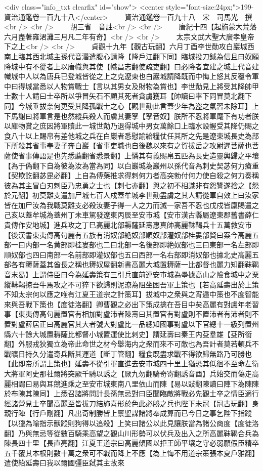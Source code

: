 <div class="info_txt clearfix" id="show">
<center style="font-size:24px;">199-資治通鑑卷一百九十八</center>
  　　資治通鑑卷一百九十八　宋　司馬光　撰<br />
<br />
　　胡三省　音註<br />
<br />
　　唐紀十四【起旃蒙大荒落六月盡著雍涒灘三月凡二年有奇】<br />
<br />
　　太宗文武大聖大廣孝皇帝下之上<br />
<br />
　　貞觀十九年【觀古玩翻】六月丁酉李世勣攻白巖城西南上臨其西北城主孫代音濳遣腹心請降【降戶江翻下同】臨城投刀鉞為信且曰奴願降城中有不從者上以唐幟與其使【幟昌志翻使疏吏翻】曰必降者宜建之城上代音建幟城中人以為唐兵已登城皆從之上之克遼東也白巖城請降既而中悔上怒其反覆令軍中曰得城當悉以人物賞戰士【言以其男女及財物為賞也】李世勣見上將受其降帥甲士數十人請曰士卒所以爭冒矢石不顧其死者貪虜獲耳【帥讀曰率下同冒莫北翻下同】今城垂拔奈何更受其降孤戰士之心【觀世勣此言蓋少年為盗之氣習未除耳】上下馬謝曰將軍言是也然縱兵殺人而虜其妻孥【孥音奴】朕所不忍將軍麾下有功者朕以庫物賞之庶因將軍贖此一城世勣乃退得城中男女萬餘口上臨水設幄受其降仍賜之食八十以上賜帛有差他城之兵在白巖者悉慰諭給糧仗任其所之先是遼東城長史為部下所殺其省事奉妻子奔白巖【省事吏職也自後魏以來有之賀拔岳之攻尉遲菩薩也菩薩使省事傳語是也先悉薦翻省悉景翻】上憐其有義賜帛五匹為長史造靈輿歸之平壤【為于偽翻下自為彼為汝為當為同】以白巖城為巖州以孫代音為刺史契苾何力瘡重【契欺訖翻苾毘必翻】上自為傅藥推求得刺何力者高突勃付何力使自殺之何力奏稱彼為其主冒白刃刺臣乃忠勇之士也【刺七亦翻】與之初不相識非有怨讐遂捨之【怨於元翻】初莫離支遣加尸城七百人戍蓋牟城李世勣盡虜之其人請從軍自效上曰汝家皆在加尸汝為我戰莫離支必殺汝妻子得一人之力而滅一家吾不忍也戊戍皆廩賜遣之己亥以蓋牟城為蓋州丁未車駕發遼東丙辰至安市城【安市漢古縣屬遼東郡舊書薛仁貴傳作安地城】進兵攻之丁巳高麗北部耨薩延壽惠真帥高麗靺鞨兵十五萬救安市【後漢書東夷傳高句麗有五族有消奴部絶奴部順奴部灌奴部桂婁部賢曰案今高麗五部一曰内部一名黄部即桂婁部也二曰北部一名後部即絶奴部也三曰東部一名左部即順奴部也四曰南部一名前部即灌奴部也五曰西部一名右部即消奴部也據北史高麗五部各有耨薩蓋其酋長之稱也耨奴屋翻新書高麗大城置耨薩一比都督也麗力知翻靺鞨音末曷】上謂侍臣曰今為延壽策有三引兵直前連安市城為壘據高山之險食城中之粟縱靺鞨掠吾牛馬攻之不可猝下欲歸則泥潦為阻坐困吾軍上策也【若高延壽出於上策不知太宗何以應之唯有江夏王道宗之計策耳】拔城中之衆與之宵遁中策也不度智能來與吾戰下策也【度徒洛翻】卿曹觀之必出下策成擒在吾目中矣高麗有對盧年老習事【東夷傳高句麗置官有相加對盧沛者陳壽曰其置官有對盧則不置沛者有沛者則不置對盧薛居正曰高麗官其大者號大對盧比一品總知國事對盧以下官總十一級列置州縣六十餘大城置耨薩比都督小城置運使比刺史】謂延壽曰秦王内芟羣雄【芟所銜翻】外服戎狄獨立為帝此命世之材今舉海内之衆而來不可敵也為吾計者莫若頓兵不戰曠日持久分遣奇兵斷其運道【斷丁管翻】糧食既盡求戰不得欲歸無路乃可勝也【此即帝所謂上策也】延壽不從引軍直進去安市城四十里上猶恐其低徊不至命左衛大將軍阿史那社爾將突厥千騎以誘之【厥九勿翻騎奇寄翻誘音酉】兵始交而偽走高麗相謂曰易與耳競進乘之至安市城東南八里依山而陳【易以䜴翻陳讀曰陣下為陳陳於布陳其陳同】上悉召諸將問計長孫無忌對曰臣聞臨敵將戰必先觀士卒之情臣適行經諸營見士卒聞高麗至皆拔刀結斾喜形於色此必勝之兵也陛下未冠【冠古玩翻】身親行陣【行戶剛翻】凡出奇制勝皆上禀聖謀諸將奉成算而已今日之事乞陛下指蹤【以獵為喻指示獸蹤則狗得以追殺】上笑曰諸公以此見讓朕當為諸公商度【度徒洛翻】乃與無忌等從數百騎乘高望之觀山川形勢可以伏兵及出入之所高麗靺鞨合兵為陳長四十里【長直亮翻】江夏王道宗曰高麗傾國以拒王師平壤之守必弱願假臣精卒五千覆其本根則數十萬之衆可不戰而降上不應【為上悔不用道宗策張本夏戶雅翻】遣使紿延壽曰我以爾國彊臣弑其主故來